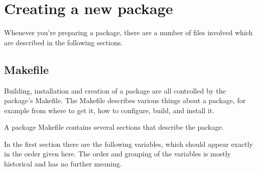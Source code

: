 %
%
%
%
%
\section{Creating a new package} %
\label{section:pkgvars}

Whenever you're preparing a package, there are a number of files involved which
are described in the following sections.

\subsection{Makefile} %
\label{subsection:makefile}

Building, installation and creation of a package are all controlled by the
package's Makefile. The Makefile describes various things about a package,
for example from where to get it, how to configure, build, and install it.

A package Makefile contains several sections that describe the package.

In the first section there are the following variables, which should appear
exactly in the order given here. The order and grouping of the variables is
mostly historical and has no further meaning.

